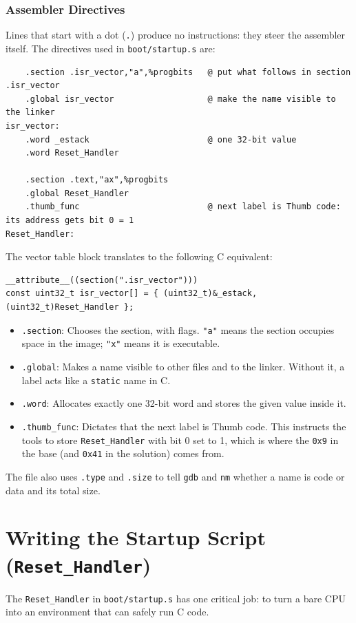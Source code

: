 \subsubsection{Assembler Directives}
Lines that start with a dot (\texttt{.}) produce no instructions: they steer the assembler itself. The directives used in \texttt{boot/startup.s} are:

\begin{lstlisting}
    .section .isr_vector,"a",%progbits   @ put what follows in section .isr_vector
    .global isr_vector                   @ make the name visible to the linker
isr_vector:
    .word _estack                        @ one 32-bit value
    .word Reset_Handler

    .section .text,"ax",%progbits
    .global Reset_Handler
    .thumb_func                          @ next label is Thumb code: its address gets bit 0 = 1
Reset_Handler:
\end{lstlisting}

The vector table block translates to the following C equivalent:
\begin{lstlisting}
__attribute__((section(".isr_vector")))
const uint32_t isr_vector[] = { (uint32_t)&_estack, (uint32_t)Reset_Handler };
\end{lstlisting}

\begin{itemize}
    \item \texttt{.section}: Chooses the section, with flags. \texttt{"a"} means the section occupies space in the image; \texttt{"x"} means it is executable.
    \item \texttt{.global}: Makes a name visible to other files and to the linker. Without it, a label acts like a \texttt{static} name in C.
    \item \texttt{.word}: Allocates exactly one 32-bit word and stores the given value inside it.
    \item \texttt{.thumb\_func}: Dictates that the next label is Thumb code. This instructs the tools to store \texttt{Reset\_Handler} with bit 0 set to 1, which is where the \texttt{0x9} in the base (and \texttt{0x41} in the solution) comes from.
\end{itemize}
The file also uses \texttt{.type} and \texttt{.size} to tell \texttt{gdb} and \texttt{nm} whether a name is code or data and its total size.

\section{Writing the Startup Script (\texttt{Reset\_Handler})}
The \texttt{Reset\_Handler} in \texttt{boot/startup.s} has one critical job: to turn a bare CPU into an environment that can safely run C code.

